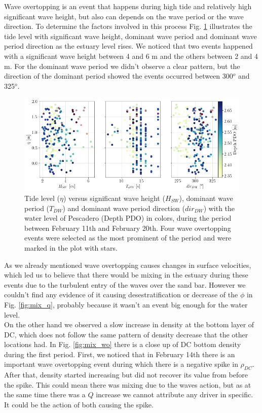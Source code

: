 \documentclass[tesis.tex]{subfiles}
\begin{document}
Wave overtopping is an event that happens during high tide and relatively high significant wave height, but also can depends on the wave period or the wave direction. To determine the factors involved in this process Fig. \ref{fig:WO} illustrates the tide level with significant wave height, dominant wave period and dominant wave period direction as the estuary level rises. We noticed that two events happened with a significant wave height between 4 and 6 m and the others between 2 and 4 m. For the dominant wave period we didn't observe a clear pattern, but the direction of the dominant period showed the events occurred between 300$^o$ and 325$^o$. \\

\begin{figure}[h!]
    \centering
    \includegraphics[width=\textwidth]{Imagenes/WO.png}
    \caption{Tide level ($\eta$) versus significant wave height ($H_{SW}$), dominant wave period ($T_{DW}$) and dominant wave period direction ($dir_{DW}$) with the water level of Pescadero (Depth PDO) in colors, during the period between February 11th and February 20th. Four wave overtopping events were selected as the most prominent of the period and were marked in the plot with stars. }
    \label{fig:WO}
\end{figure}

As we already mentioned wave overtopping causes changes in surface velocities, which led us to believe that there would be mixing in the estuary during these events due to the turbulent entry of the waves over the sand bar. However we couldn't find any evidence of it causing desestratification or decrease of the $\phi$ in Fig. \ref{fig:mix_q}, probably because it wasn't an event big enough for the water level. \\

On the other hand we observed a slow increase in density at the bottom layer of DC, which does not follow the same pattern of density decrease that the other locations had. In Fig. \ref{fig:mix_wo} there is a close up of DC bottom density during the first period. First, we noticed that in February 14th there is an important wave overtopping event during which there is a negative spike in $\rho_{DC}$. After that, density started increasing but did not recover its value from before the spike. This could mean there was mixing due to the waves action, but as at the same time there was a $Q$ increase we cannot attribute any driver in specific. It could be the action of both causing the spike.\\
\end{document}
